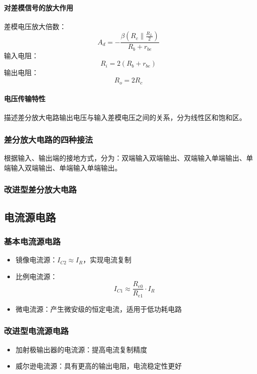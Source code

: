 \paragraph{对差模信号的放大作用}
差模电压放大倍数：
\[ A_{d} = -\frac{\beta \left( R_{c} \parallel \frac{R_{L}}{2} \right)}{R_{b} + r_{be}} \]
输入电阻：
\[ R_i=2(R_b+r_{be}) \]
输出电阻：
\[ R_o=2R_c \]

\paragraph{电压传输特性}
描述差分放大电路输出电压与输入差模电压之间的关系，分为线性区和饱和区。

\subsubsection{差分放大电路的四种接法}
根据输入、输出端的接地方式，分为：双端输入双端输出、双端输入单端输出、单端输入双端输出、单端输入单端输出。

\subsubsection{改进型差分放大电路}

\subsection{电流源电路}
\subsubsection{基本电流源电路}
\begin{itemize}
    \item 镜像电流源：$I_{C2} \approx I_R$，实现电流复制
    \item 比例电流源：
    \[ I_{C1}\approx \frac{R_{e0}}{R_{e1}} \cdot I_R \]
    \item 微电流源：产生微安级的恒定电流，适用于低功耗电路
\end{itemize}

\subsubsection{改进型电流源电路}
\begin{itemize}
    \item 加射极输出器的电流源：提高电流复制精度
    \item 威尔逊电流源：具有更高的输出电阻，电流稳定性更好
\end{itemize}

